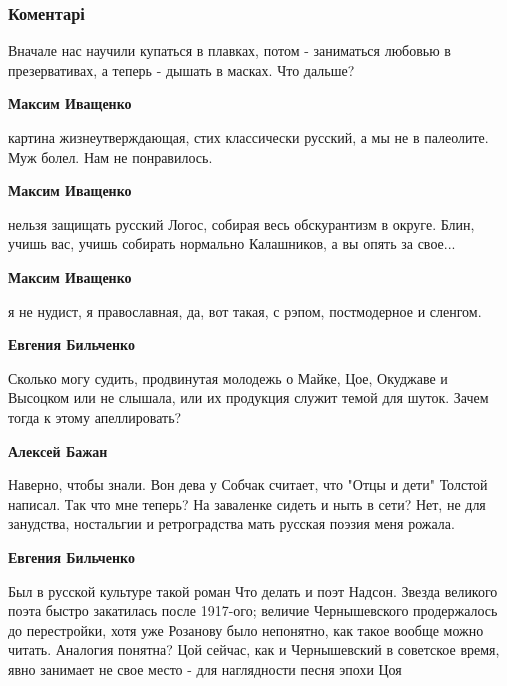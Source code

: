  
 
 
 
 
\subsubsection{Коментарі}

\begin{itemize} %
Вначале нас научили купаться в плавках, потом - заниматься любовью в презервативах, а теперь - дышать в масках. Что дальше?

\begin{itemize} %
\textbf{Максим Иващенко} 

картина жизнеутверждающая, стих классически русский, а мы не в палеолите. Муж
болел. Нам не понравилось.


\textbf{Максим Иващенко} 

нельзя защищать русский Логос, собирая весь обскурантизм в округе. Блин, учишь
вас, учишь собирать нормально Калашников, а вы опять за свое...


\textbf{Максим Иващенко} 

я не нудист, я православная, да, вот такая, с рэпом, постмодерное и сленгом.

\textbf{Евгения Бильченко} 

Сколько могу судить, продвинутая молодежь о Майке, Цое, Окуджаве и Высоцком или
не слышала, или их продукция служит темой для шуток. Зачем тогда к этому
апеллировать?

\textbf{Алексей Бажан} 

Наверно, чтобы знали. Вон дева у Собчак считает, что "Отцы и дети" Толстой
написал. Так что мне теперь? На заваленке сидеть и ныть в сети? Нет, не для
занудства, ностальгии и ретроградства мать русская поэзия меня рожала.

\textbf{Евгения Бильченко} 

Был в русской культуре такой роман Что делать и поэт Надсон. Звезда великого
поэта быстро закатилась после 1917-ого; величие Чернышевского продержалось до
перестройки, хотя уже Розанову было непонятно, как такое вообще можно читать.
Аналогия понятна? Цой сейчас, как и Чернышевский в советское время, явно
занимает не свое место - для наглядности песня эпохи Цоя


\end{itemize}
\end{itemize}
